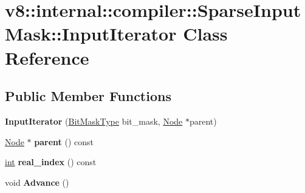\hypertarget{classv8_1_1internal_1_1compiler_1_1SparseInputMask_1_1InputIterator}{}\section{v8\+:\+:internal\+:\+:compiler\+:\+:Sparse\+Input\+Mask\+:\+:Input\+Iterator Class Reference}
\label{classv8_1_1internal_1_1compiler_1_1SparseInputMask_1_1InputIterator}
\subsection*{Public Member Functions}
\begin{DoxyCompactItemize}
\item 
\mbox{\label{classv8_1_1internal_1_1compiler_1_1SparseInputMask_1_1InputIterator_ad36b42b45893e31dda1d4478311c0e90}} 
{\bfseries Input\+Iterator} (\mbox{\hyperlink{classuint32__t}{Bit\+Mask\+Type}} bit\+\_\+mask, \mbox{\hyperlink{classv8_1_1internal_1_1compiler_1_1Node}{Node}} $\ast$parent)
\item 
\mbox{\label{classv8_1_1internal_1_1compiler_1_1SparseInputMask_1_1InputIterator_ab395b19cc22fe7d2fd5b2f7f2bddc40a}} 
\mbox{\hyperlink{classv8_1_1internal_1_1compiler_1_1Node}{Node}} $\ast$ {\bfseries parent} () const
\item 
\mbox{\label{classv8_1_1internal_1_1compiler_1_1SparseInputMask_1_1InputIterator_aca63164577ab9054bb2a6a608045a892}} 
\mbox{\hyperlink{classint}{int}} {\bfseries real\+\_\+index} () const
\item 
\mbox{\label{classv8_1_1internal_1_1compiler_1_1SparseInputMask_1_1InputIterator_aa9f70b65f86f3801979b037203e45fb4}} 
void {\bfseries Advance} ()
\item 
\mbox{\label{classv8_1_1internal_1_1compiler_1_1SparseInputMask_1_1InputIterator_afa244ee9d506319f110c7b29a07d6bec}} 

\end{DoxyCompactItemize}
